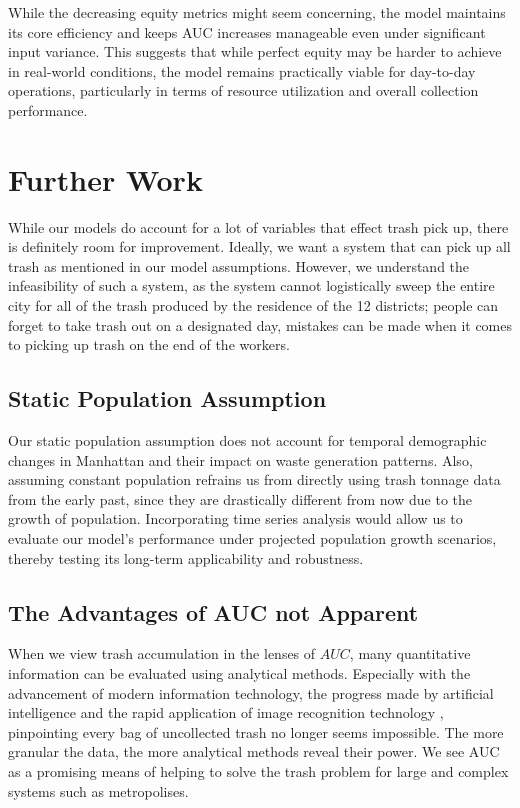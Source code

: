 \documentclass{article}
\begin{document}
While the decreasing equity metrics might seem concerning, the model maintains its core efficiency and keeps AUC increases manageable even under significant input variance. This suggests that while perfect equity may be harder to achieve in real-world conditions, the model remains practically viable for day-to-day operations, particularly in terms of resource utilization and overall collection performance.

\section{Further Work}

While our models do account for a lot of variables that effect trash pick up, there is definitely room for improvement. Ideally, we want a system that can pick up all trash as mentioned in our model assumptions. However, we understand the infeasibility of such a system, as the system cannot logistically sweep the entire city for all of the trash produced by the residence of the 12 districts; people can forget to take trash out on a designated day, mistakes can be made when it comes to picking up trash on the end of the workers.

\subsection{Static Population Assumption}

Our static population assumption does not account for temporal demographic changes in Manhattan and their impact on waste generation patterns. Also, assuming constant population refrains us from directly using trash tonnage data from the early past, since they are drastically different from now due to the growth of population. Incorporating time series analysis would allow us to evaluate our model's performance under projected population growth scenarios, thereby testing its long-term applicability and robustness.

\subsection{The Advantages of AUC not Apparent}

When we view trash accumulation in the lenses of $AUC$, many quantitative information can be evaluated using analytical methods. Especially with the advancement of modern information technology, the progress made by artificial intelligence and the rapid application of image recognition technology \cite{hossain2019autonomous}, pinpointing every bag of uncollected trash no longer seems impossible. The more granular the data, the more analytical methods reveal their power. We see AUC as a promising means of helping to solve the trash problem for large and complex systems such as metropolises.
\end{document}
